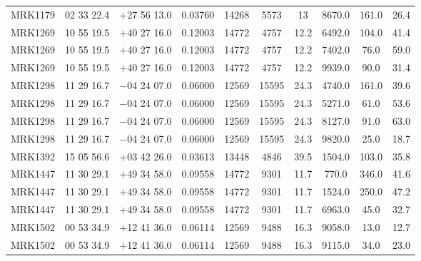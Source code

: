 \begin{landscape}
\begin{center}
\begin{longtable}{l c c c c c c c c c}
MRK1179  &                 02 33 22.4  &         $+$27 56 13.0  &       0.03760  & 14268  &   5573  &       13  &        8670.0  &  161.0  &  26.4  \\
MRK1269  &                 10 55 19.5  &         $+$40 27 16.0  &       0.12003  & 14772  &   4757  &       12.2  &      6492.0  &  104.0  &  41.4  \\
MRK1269  &                 10 55 19.5  &         $+$40 27 16.0  &       0.12003  & 14772  &   4757  &       12.2  &      7402.0  &  76.0  &   59.0  \\
MRK1269  &                 10 55 19.5  &         $+$40 27 16.0  &       0.12003  & 14772  &   4757  &       12.2  &      9939.0  &  90.0  &   31.4  \\
MRK1298  &                 11 29 16.7  &         $-$04 24 07.0  &       0.06000  & 12569  &   15595  &      24.3  &      4740.0  &  161.0  &  39.6  \\
MRK1298  &                 11 29 16.7  &         $-$04 24 07.0  &       0.06000  & 12569  &   15595  &      24.3  &      5271.0  &  61.0  &   53.6  \\
MRK1298  &                 11 29 16.7  &         $-$04 24 07.0  &       0.06000  & 12569  &   15595  &      24.3  &      8127.0  &  91.0  &   63.0  \\
MRK1298  &                 11 29 16.7  &         $-$04 24 07.0  &       0.06000  & 12569  &   15595  &      24.3  &      9820.0  &  25.0  &   18.7  \\
MRK1392  &                 15 05 56.6  &         $+$03 42 26.0  &       0.03613  & 13448  &   4846  &       39.5  &      1504.0  &  103.0  &  35.8  \\
MRK1447  &                 11 30 29.1  &         $+$49 34 58.0  &       0.09558  & 14772  &   9301  &       11.7  &      770.0  &   346.0  &  41.6  \\
MRK1447  &                 11 30 29.1  &         $+$49 34 58.0  &       0.09558  & 14772  &   9301  &       11.7  &      1524.0  &  250.0  &  47.2  \\
MRK1447  &                 11 30 29.1  &         $+$49 34 58.0  &       0.09558  & 14772  &   9301  &       11.7  &      6963.0  &  45.0  &   32.7  \\
MRK1502  &                 00 53 34.9  &         $+$12 41 36.0  &       0.06114  & 12569  &   9488  &       16.3  &      9058.0  &  13.0  &   12.7  \\
MRK1502  &                 00 53 34.9  &         $+$12 41 36.0  &       0.06114  & 12569  &   9488  &       16.3  &      9115.0  &  34.0  &   23.0  \\

\end{longtable}
\end{center}
\end{landscape}
